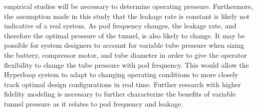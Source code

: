 empirical studies will be necessary to determine operating pressure.
Furthermore, the assumption made in this study that the leakage rate is constant is
likely not indicative of a real system. As pod frequency changes, the
leakage rate, and therefore the optimal pressure of the tunnel, is also likely to change.
It may be possible for system designers to account for variable tube pressure
when sizing the battery, compressor motor, and tube diameter in order to give
the operator flexibility to change the tube pressure with pod frequency.
This would allow the Hyperloop system to adapt to changing operating conditions
to more closely track optimal design configurations in real time.
Further research with higher fidelity modeling is necessary to further
characterize the benefits of variable tunnel pressure as it relates to pod frequency and leakage.
